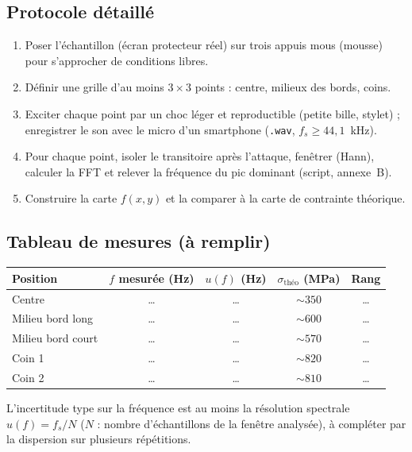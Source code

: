 \documentclass[11pt,a4paper]{article}
\begin{document}
\subsection{Protocole détaillé}
\begin{enumerate}[leftmargin=2em,itemsep=1pt]
  \item Poser l'échantillon (écran protecteur réel) sur trois appuis mous
        (mousse) pour s'approcher de conditions libres.
  \item Définir une grille d'au moins $3\times3$ points : centre, milieux des
        bords, coins.
  \item Exciter chaque point par un choc léger et reproductible (petite bille,
        stylet) ; enregistrer le son avec le micro d'un smartphone
        (\texttt{.wav}, $f_s\ge 44{,}1$~kHz).
  \item Pour chaque point, isoler le transitoire après l'attaque, fenêtrer
        (Hann), calculer la FFT et relever la fréquence du pic dominant
        (script, annexe~B).
  \item Construire la carte $f(x,y)$ et la comparer à la carte de contrainte
        théorique.
\end{enumerate}

\subsection{Tableau de mesures (à remplir)}

\begin{center}\small
\begin{tabular}{lcccc}
\toprule
Position & $f$ mesurée (Hz) & $u(f)$ (Hz) & $\sigma_{\text{théo}}$ (MPa) & Rang \\
\midrule
Centre            & \dots & \dots & $\sim 350$ & \dots \\
Milieu bord long  & \dots & \dots & $\sim 600$ & \dots \\
Milieu bord court & \dots & \dots & $\sim 570$ & \dots \\
Coin 1            & \dots & \dots & $\sim 820$ & \dots \\
Coin 2            & \dots & \dots & $\sim 810$ & \dots \\
\bottomrule
\end{tabular}
\end{center}

L'incertitude type sur la fréquence est au moins la résolution spectrale
$u(f)=f_s/N$ ($N$ : nombre d'échantillons de la fenêtre analysée), à compléter
par la dispersion sur plusieurs répétitions.
\end{document}
